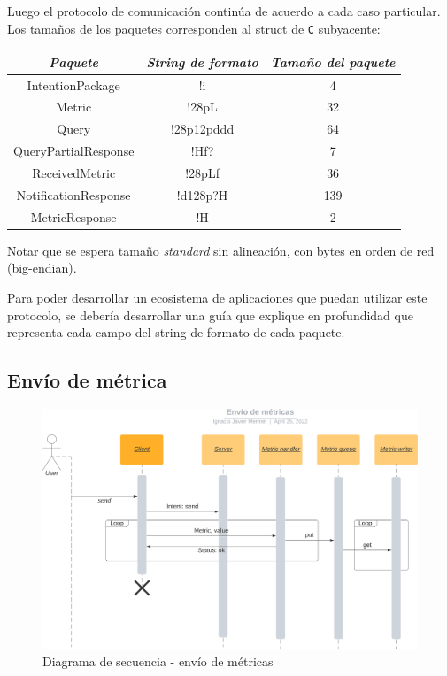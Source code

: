\documentclass[titlepage,a4paper,oneside]{article}
\begin{document}
Luego el protocolo de comunicación continúa de acuerdo a cada caso particular. Los tamaños de los paquetes corresponden al struct de \texttt{C} subyacente:

\begin{table}[H]
\centering
\begin{tabular}{c|c|c}
\textit{Paquete}     & \textit{String de formato} & \textit{Tamaño del paquete}  \\
\hline
IntentionPackage     & !i                         & 4                            \\
Metric               & !28pL                      & 32                           \\
Query                & !28p12pddd                 & 64                           \\
QueryPartialResponse & !Hf?                       & 7                            \\
ReceivedMetric       & !28pLf                     & 36                           \\
NotificationResponse & !d128p?H                   & 139                          \\
MetricResponse       & !H                         & 2
\end{tabular}
\end{table}

Notar que se espera tamaño \textit{standard} sin alineación, con bytes en orden de red (big-endian).

Para poder desarrollar un ecosistema de aplicaciones que puedan utilizar este protocolo, se debería desarrollar una guía que explique en profundidad que representa cada campo del string de formato de cada paquete.

\subsection{Envío de métrica}
\begin{figure}[H]
\centering
\includegraphics[width=\textwidth]{images/envio_metricas.png}
\caption{Diagrama de secuencia \-- envío de métricas}
\end{figure}
\end{document}

